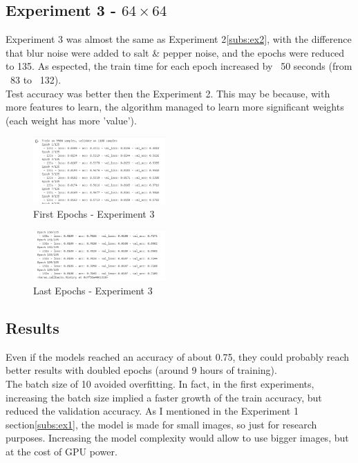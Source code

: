 \documentclass[twocolumn,showpacs,%
  nofootinbib,aps,superscriptaddress,%
  eqsecnum,prd,notitlepage,showkeys,10pt]{revtex4-1}
\begin{document}
\subsection{Experiment 3 - $64\times64$}
Experiment 3 was almost the same as Experiment 2\ref{subs:ex2}, with the difference that blur noise were added to salt \& pepper noise, and the epochs were reduced to 135. As espected, the train time for each epoch increased by ~50 seconds (from ~83 to ~132).\\
Test accuracy was better then the Experiment 2. This may be because, with more features to learn, the algorithm managed to learn more significant weights (each weight has more 'value').

\begin{figure}[H]
    \includegraphics[width=0.45\textwidth]{images/fullnoise_fit_1.PNG}
    \caption{\label{fig:noise}First Epochs - Experiment 3}
\end{figure}
\begin{figure}[H]
    \includegraphics[width=0.45\textwidth]{images/fullnoise_fit_2.PNG}
    \caption{\label{fig:noise}Last Epochs - Experiment 3}
\end{figure}


\subsection{Results}
Even if the models reached an accuracy of about 0.75, they could probably reach better results with doubled epochs (around 9 hours of training).\\
The batch size of 10 avoided overfitting. In fact, in the first experiments, increasing the batch size implied a faster growth of the train accuracy, but reduced the validation accuracy.
As I mentioned in the Experiment 1 section\ref{subs:ex1}, the model is made for small images, so just for research purposes. Increasing the model complexity would allow to use bigger images, but at the cost of GPU power.\\
\end{document}
